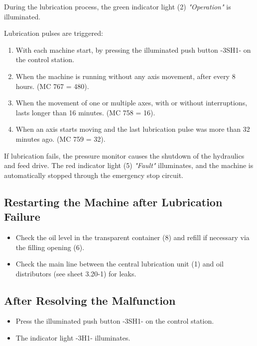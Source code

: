 \vspace{.3cm}

\noindent During the lubrication process, the green indicator light (2) \textit{"Operation"} is illuminated.

\vspace{.3cm}

\noindent Lubrication pulses are triggered:

\begin{enumerate}
    \item With each machine start, by pressing the illuminated push button -3SH1- on the control station.\footnotemark
    \item When the machine is running without any axis movement, after every 8 hours. (MC 767 = 480).
    \item When the movement of one or multiple axes, with or without interruptions, lasts longer than 16 minutes. (MC 758 = 16).
    \item When an axis starts moving and the last lubrication pulse was more than 32 minutes ago. (MC 759 = 32).
\end{enumerate}

\noindent If lubrication fails, the pressure monitor causes the shutdown of the hydraulics and feed drive. The red indicator light (5) \textit{"Fault"} illuminates, and the machine is automatically stopped through the emergency stop circuit.

\subsection*{Restarting the Machine after Lubrication Failure}

\begin{itemize}
    \item Check the oil level in the transparent container (8) and refill if necessary via the filling opening (6).\footnotemark
    \item Check the main line between the central lubrication unit (1) and oil distributors (see sheet 3.20-1) for leaks.
\end{itemize}

\subsection*{After Resolving the Malfunction}

\begin{itemize}
    \item Press the illuminated push button -3SH1- on the control station.\footnotemark[1]
    \item The indicator light -3H1- illuminates.
\end{itemize}


